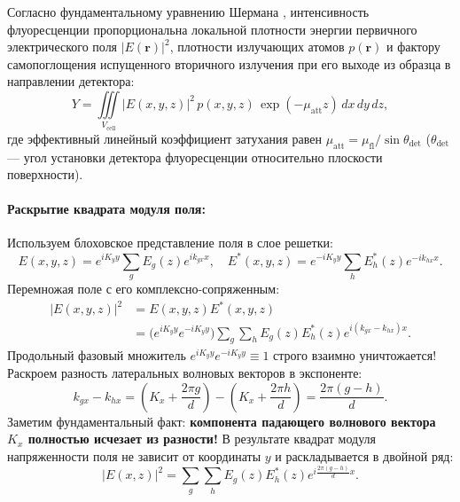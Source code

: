 \documentclass[a4paper,11pt]{article}
\begin{document}
Согласно фундаментальному уравнению Шермана \cite{sherman1955, nikolaev2020}, интенсивность флуоресценции пропорциональна локальной плотности энергии первичного электрического поля $|E(\mathbf{r})|^2$, плотности излучающих атомов $p(\mathbf{r})$ и фактору самопоглощения испущенного вторичного излучения при его выходе из образца в направлении детектора:
\begin{equation}
    Y = \iiint\limits_{V_{\text{cell}}} |E(x, y, z)|^2 \, p(x, y, z) \, \exp(-\mu_{\text{att}} z) \, dx \, dy \, dz,
    \label{eq:sherman_general}
\end{equation}
где эффективный линейный коэффициент затухания равен $\mu_{\text{att}} = \mu_{\text{fl}} / \sin\theta_{\text{det}}$ ($\theta_{\text{det}}$ — угол установки детектора флуоресценции относительно плоскости поверхности).

\paragraph{Раскрытие квадрата модуля поля:}
Используем блоховское представление поля в слое решетки:
\begin{equation}
    E(x, y, z) = e^{i K_y y} \sum_g E_g(z) e^{i k_{gx} x}, \quad E^*(x, y, z) = e^{-i K_y y} \sum_h E_h^*(z) e^{-i k_{hx} x}.
\end{equation}
Перемножая поле с его комплексно-сопряженным:
\begin{align}
    |E(x, y, z)|^2 &= E(x, y, z) E^*(x, y, z) \nonumber \\
    &= \big(e^{i K_y y} e^{-i K_y y}\big) \sum_g \sum_h E_g(z) E_h^*(z) e^{i (k_{gx} - k_{hx}) x}.
\end{align}
Продольный фазовый множитель $e^{i K_y y} e^{-i K_y y} \equiv 1$ строго взаимно уничтожается!
Раскроем разность латеральных волновых векторов в экспоненте:
\begin{equation}
    k_{gx} - k_{hx} = \left( K_x + \frac{2\pi g}{d} \right) - \left( K_x + \frac{2\pi h}{d} \right) = \frac{2\pi (g - h)}{d}.
\end{equation}
Заметим фундаментальный факт: \textbf{компонента падающего волнового вектора $K_x$ полностью исчезает из разности!} 
В результате квадрат модуля напряженности поля не зависит от координаты $y$ и раскладывается в двойной ряд:
\begin{equation}
    |E(x, z)|^2 = \sum_g \sum_h E_g(z) E_h^*(z) e^{i \frac{2\pi (g - h)}{d} x}.
\end{equation}
\end{document}
